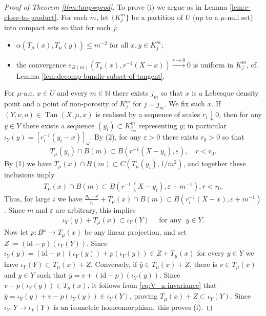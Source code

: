 \documentclass{amsart}
\numberwithin{equation}{section}
\newcommand{\N}{\mathbb{N}}
\newcommand{\id}{\mathrm {id}}
\newcommand{\inv}{^{-1}}
\newcommand{\Tan}{\operatorname{Tan}}
\begin{document}
\begin{proof}[Proof of Theorem \ref{thm:tang=prod}]
To prove (i) we argue as in Lemma \ref{lem:e-close-to-product}. For each $m$, let $\{K_j^m\}$ be a partition of $U$ (up to a $\mu$-null set) into compact sets so that for each $j$:
\begin{itemize}
    \item[(1)] $\alpha(T_\mu(x),T_\mu(y))\le m^{-2}$ for all $x,y\in K_j^m$;
    \item[(2)] the convergence $e_{B(m)}(T_\mu(x),r\inv(X-x))\stackrel{r\to 0}{\longrightarrow} 0$ is uniform in $K^m_j$, cf. Lemma \ref{lem:decomp-bundle-subset-of-tangent}.
\end{itemize}

For $\mu$-a.e. $x\in U$ and every $m\in\N$ there exists $j_m$ so that $x$ is a Lebesque density point and a point of non-porosity of $K_j^m$ for $j=j_m$. We fix such $x$. If $(Y,\nu,o)\in\Tan(X,\mu,x)$ is realised by a sequence of scales $r_i\downarrow 0$, then for any $y\in Y$ there exists a sequence $(y_i)\subset K^m_{j_m}$ representing $y$; in particular $\iota_Y(y)=[r_i\inv(y_i-x)]_\omega$. By (2), for any $\varepsilon>0$ there exists $r_0>0$ so that
\begin{align*}
T_\mu({y_i})\cap B(m)\subset B(r\inv(X-y_i),\varepsilon),\quad r<r_0.
\end{align*}
By (1) we have $T_\mu(x)\cap B(m)\subset C(T_\mu({y_i}),1/m^2)$, and together these inclusions imply 
\begin{align*}
    T_\mu(x)\cap B(m)\subset B(r\inv(X-y_i),\varepsilon+m^{-1}), r<r_0.
\end{align*}
Thus, for large $i$ we have $\frac{y_i-x}{r_i}+T_\mu(x)\cap B(m)\subset B(r_i\inv(X-x),\varepsilon+m\inv)$. Since $m$ and $\varepsilon$ are arbitrary, this implies 
\begin{align}\label{eq:V_x-invariance}
    \iota_Y(y)+T_\mu(x)\subset \iota_Y(Y)\quad \mbox{ for any }\;y\in Y. 
\end{align}
Now let $p:B^\omega\to T_\mu(x)$ be any linear projection, and set $Z:=(\id-p)(\iota_Y(Y))$. Since $\iota_Y(y)=(\id-p)(\iota_Y(y))+p(\iota_Y(y))\in Z+T_\mu(x)$ for every $y\in Y$ we have $\iota_Y(Y)\subset T_\mu(x)+Z$. Conversely, if $\bar y\in T_\mu(x)+Z$, there is $v\in T_\mu(x)$ and $y\in Y$ such that $\bar y=v+(\id-p)(\iota_Y(y))$. Since $v-p(\iota_Y(y))\in T_\mu(x)$, it follows from \eqref{eq:V_x-invariance} that $\bar y =\iota_Y(y)+v-p(\iota_Y(y))\in \iota_Y(Y)$,  proving $T_\mu(x)+Z\subset \iota_Y(Y)$. Since $\iota_Y:Y\to \iota_Y(Y)$ is an isometric homeomorphism, this proves (i).


\end{proof}
\end{document}
